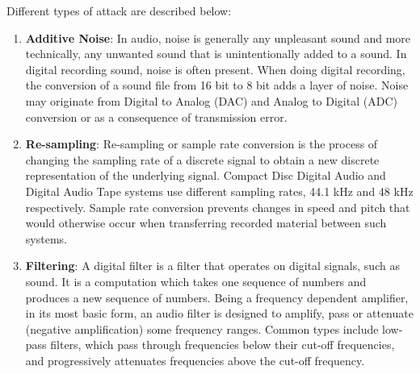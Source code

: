 \documentclass[12pt,a4paper]{report}
\begin{document}
Different types of attack are described below:

\begin{enumerate}

\item \textbf{Additive Noise}: In audio, noise is generally any unpleasant sound and more technically, any unwanted sound that is unintentionally added to a sound. In digital recording sound, noise is often present. When doing digital recording, the conversion of a sound file from 16 bit to 8 bit adds a layer of noise. Noise may originate from Digital to Analog (DAC) and Analog to Digital (ADC) conversion or as a consequence of transmission error. %

\item \textbf{Re-sampling}: Re-sampling or sample rate conversion is the process of changing the sampling rate of a discrete signal to obtain a new discrete representation of the underlying signal. Compact Disc Digital Audio and Digital Audio Tape systems use different sampling rates, 44.1 kHz and 48 kHz respectively. Sample rate conversion prevents changes in speed and pitch that would otherwise occur when transferring recorded material between such systems. %

\item \textbf{Filtering}: %
A digital filter is a filter that operates on digital signals, such as sound. It is a computation which takes one sequence of numbers and produces a new sequence of numbers. Being a frequency dependent amplifier, in its most basic form, an audio filter is designed to amplify, pass or attenuate (negative amplification) some frequency ranges. Common types include low-pass filters, which pass through frequencies below their cut-off frequencies, and progressively attenuates frequencies above the cut-off frequency. %


\end{enumerate}
\end{document}
